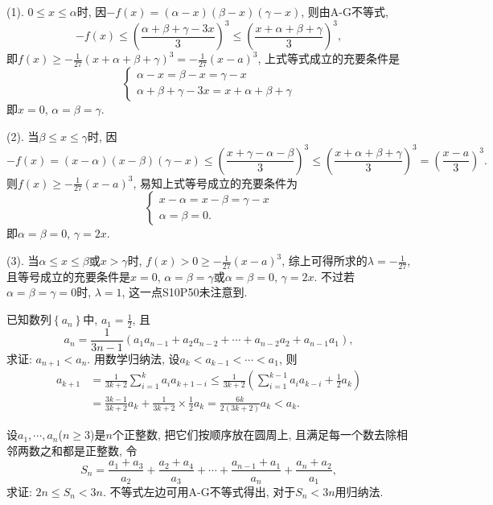 (1). $0\le x\le\alpha$时, 因$-f\left(x\right)=\left(\alpha-x\right)\left(\beta-x\right)\left(\gamma-x\right)$,
则由A-G不等式,
\[
-f\left(x\right)\le\left(\frac{\alpha+\beta+\gamma-3x}{3}\right)^{3}\le\left(\frac{x+\alpha+\beta+\gamma}{3}\right)^{3},
\]
即$f\left(x\right)\ge-\frac{1}{27}\left(x+\alpha+\beta+\gamma\right)^{3}=-\frac{1}{27}\left(x-a\right)^{3}$,
上式等式成立的充要条件是
\[
\begin{cases}
\alpha-x=\beta-x=\gamma-x\\
\alpha+\beta+\gamma-3x=x+\alpha+\beta+\gamma
\end{cases}
\]
即$x=0$, $\alpha=\beta=\gamma$.

(2). 当$\beta\le x\le\gamma$时, 因
\[
-f\left(x\right)=\left(x-\alpha\right)\left(x-\beta\right)\left(\gamma-x\right)\le\left(\frac{x+\gamma-\alpha-\beta}{3}\right)^{3}\le\left(\frac{x+\alpha+\beta+\gamma}{3}\right)^{3}=\left(\frac{x-a}{3}\right)^{3}.
\]
则$f\left(x\right)\ge-\frac{1}{27}\left(x-a\right)^{3}$, 易知上式等号成立的充要条件为
\[
\begin{cases}
x-\alpha=x-\beta=\gamma-x\\
\alpha=\beta=0.
\end{cases}
\]
即$\alpha=\beta=0$, $\gamma=2x$.

(3). 当$\alpha\le x\le\beta$或$x>\gamma$时, $f\left(x\right)>0\ge-\frac{1}{27}\left(x-a\right)^{3}$,
综上可得所求的$\lambda=-\frac{1}{27}$, 且等号成立的充要条件是$x=0$, $\alpha=\beta=\gamma$或$\alpha=\beta=0$,
$\gamma=2x$. 不过若$\alpha=\beta=\gamma=0$时, $\lambda=1$, 这一点S10P50未注意到.
\ea

\bq{}{}
已知数列$\left\{ a_{n}\right\} $中, $a_{1}=\frac{1}{2}$, 且
\[
a_{n}=\frac{1}{3n-1}\left(a_{1}a_{n-1}+a_{2}a_{n-2}+\cdots+a_{n-2}a_{2}+a_{n-1}a_{1}\right),
\]
求证: $a_{n+1}<a_{n}$.
\eq
\ba
用数学归纳法, 设$a_{k}<a_{k-1}<\cdots<a_{1}$, 则
\[
\begin{aligned}a_{k+1} & =\frac{1}{3k+2}\sum_{i=1}^{k}a_{i}a_{k+1-i}\le\frac{1}{3k+2}\left(\sum_{i=1}^{k-1}a_{i}a_{k-i}+\frac{1}{2}a_{k}\right)\\
 & =\frac{3k-1}{3k+2}a_{k}+\frac{1}{3k+2}\times\frac{1}{2}a_{k}=\frac{6k}{2\left(3k+2\right)}a_{k}<a_{k}.
\end{aligned}
\]
\ea

\bq{}{}
设$a_{1},\cdots,a_{n}$($n\ge3$)是$n$个正整数, 把它们按顺序放在圆周上, 且满足每一个数去除相邻两数之和都是正整数,
令
\[
S_{n}=\frac{a_{1}+a_{3}}{a_{2}}+\frac{a_{2}+a_{4}}{a_{3}}+\cdots+\frac{a_{n-1}+a_{1}}{a_{n}}+\frac{a_{n}+a_{2}}{a_{1}},
\]
求证: $2n\le S_{n}<3n$.
\eq
\ba
不等式左边可用A-G不等式得出, 对于$S_{n}<3n$用归纳法.

